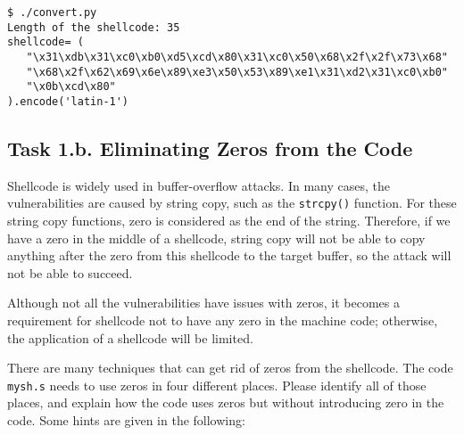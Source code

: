 \begin{lstlisting}
$ ./convert.py
Length of the shellcode: 35
shellcode= (
   "\x31\xdb\x31\xc0\xb0\xd5\xcd\x80\x31\xc0\x50\x68\x2f\x2f\x73\x68"
   "\x68\x2f\x62\x69\x6e\x89\xe3\x50\x53\x89\xe1\x31\xd2\x31\xc0\xb0"
   "\x0b\xcd\x80"
).encode('latin-1')
\end{lstlisting}



\subsection{Task 1.b. Eliminating Zeros from the Code}

Shellcode is widely used in buffer-overflow attacks. In many 
cases, the vulnerabilities are caused by string copy, such
as the \texttt{strcpy()} function. For these string copy functions,
zero is considered as the end of the string. Therefore, if we have 
a zero in the middle of a shellcode, string copy will not be able to
copy anything after the zero from this shellcode to the target 
buffer, so the attack will not be able to succeed. 

Although not all the vulnerabilities have issues with zeros, 
it becomes a requirement for shellcode not to have any zero in
the machine code; otherwise, the application of a shellcode 
will be limited. 

There are many techniques that can get rid of zeros 
from the shellcode. The code \texttt{mysh.s} needs to 
use zeros in four different places. Please identify all
of those places, and explain how the code uses zeros
but without introducing zero in the code. Some hints 
are given in the following:


